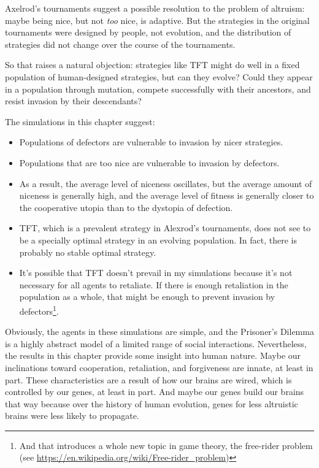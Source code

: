 \documentclass[12pt]{book}
\theoremstyle{exercise}
\begin{document}
Axelrod's tournaments suggest a possible resolution to the problem of altruism: maybe being nice, but not {\em too} nice, is adaptive.  But the strategies in the original tournaments were designed by people, not evolution, and the distribution of strategies did not change over the course of the tournaments.

So that raises a natural objection: strategies like TFT might do well in a fixed population of human-designed strategies, but can they evolve?  Could they appear in a population through mutation, compete successfully with their ancestors, and resist invasion by their descendants?

The simulations in this chapter suggest:

\begin{itemize}

\item Populations of defectors are vulnerable to invasion by nicer strategies.

\item Populations that are too nice are vulnerable to invasion by defectors.

\item As a result, the average level of niceness oscillates, but the average amount of niceness is generally high, and the average level of fitness is generally closer to the cooperative utopia than to the dystopia of defection.

\item TFT, which is a prevalent strategy in Alexrod's tournaments, does not see to be a specially optimal strategy in an evolving population.  In fact, there is probably no stable optimal strategy.

\item It's possible that TFT doesn't prevail in my simulations because it's not necessary for all agents to retaliate.  If there is enough retaliation in the population as a whole, that might be enough to prevent invasion by defectors\footnote{And that introduces a whole new topic in game theory, the free-rider problem (see \url{https://en.wikipedia.org/wiki/Free-rider_problem})}. 

\end{itemize}

Obviously, the agents in these simulations are simple, and the Prisoner's Dilemma is a highly abstract model of a limited range of social interactions.  Nevertheless, the results in this chapter provide some insight into human nature.  Maybe our inclinations toward cooperation, retaliation, and forgiveness are innate, at least in part.  These characteristics are a result of how our brains are wired, which is controlled by our genes, at least in part.  And maybe our genes build our brains that way because over the history of human evolution, genes for less altruistic brains were less likely to propagate.  
\end{document}

